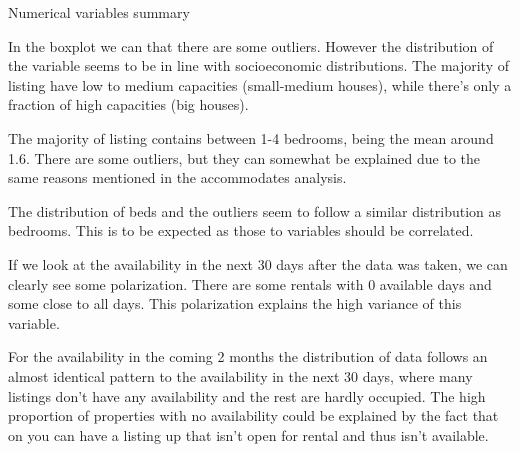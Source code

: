 
\begin{table}[H]
    \centering
    \caption{Numerical variables summary}%
    \label{tab:num_summary}
    \resizebox{\linewidth}{!}{%
    
}
\end{table}





In the boxplot we can that there are some outliers. However the distribution of
the variable seems to be in line with socioeconomic distributions. The majority
of listing have low to medium capacities (small-medium houses), while there's
only a fraction of high capacities (big houses).



The majority of listing contains between 1-4 bedrooms, being the mean around
1.6. There are some outliers, but they can somewhat be explained due to the same
reasons mentioned in the accommodates analysis.



The distribution of beds and the outliers seem to follow a similar distribution
as bedrooms.  This is to be expected as those to variables should be correlated.



If we look at the availability in the next 30 days after the data was taken, we
can clearly see some polarization. There are some rentals with 0 available days
and some close to all days. This polarization explains the high variance of this
variable.



For the availability in the coming 2 months the distribution of data
follows an almost identical pattern to the availability in the next
30 days, where many listings don't have any availability and the rest
are hardly occupied. The high proportion of properties with no
availability could be explained by the fact that on \airbnb
you can have a listing up that isn't open for rental and thus isn't
available.

